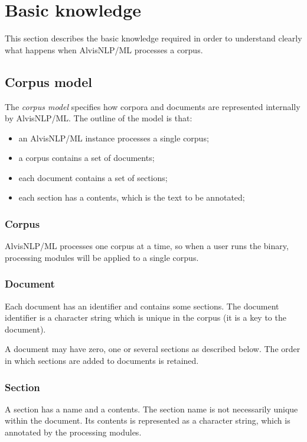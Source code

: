 \documentclass[a4paper]{book}
\begin{document}
\chapter{Basic knowledge}
This section describes the basic knowledge required in order to understand clearly what happens when AlvisNLP/ML processes a corpus.

\section{Corpus model}
\label{CorpusModel}
The \emph{corpus model} specifies how corpora and documents are represented internally by AlvisNLP/ML.
The outline of the model is that:
\begin{itemize}
\item an AlvisNLP/ML instance processes a single corpus;
\item a corpus contains a set of documents;
\item each document contains a set of sections;
\item each section has a contents, which is the text to be annotated;
\end{itemize}

\subsection{Corpus}
AlvisNLP/ML processes one corpus at a time, so when a user runs the binary, processing modules will be applied to a single corpus.

\subsection{Document}
Each document has an identifier and contains some sections.
The document identifier is a character string which is unique in the corpus (it is a key to the document).

A document may have zero, one or several sections as described below.
The order in which sections are added to documents is retained.

\subsection{Section}
A section has a name and a contents.
The section name is not necessarily unique within the document.
Its contents is represented as a character string, which is annotated by the processing modules.
\end{document}
